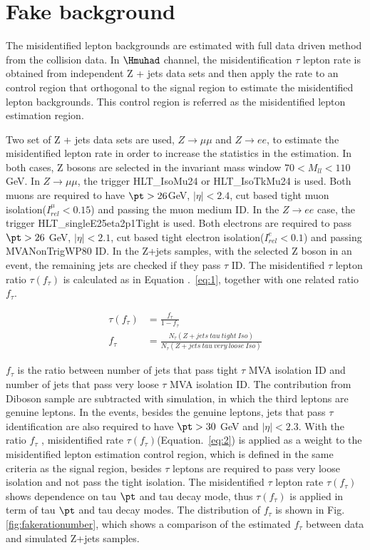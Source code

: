 


\chapter{Fake background}

The misidentified lepton backgrounds are estimated with full data driven method from the collision data. In $\Hmuhad$ channel,  the misidentification $\tau$ lepton rate is obtained from independent Z + jets data sets and then apply the rate to an control region that orthogonal to the signal region to estimate the misidentified lepton backgrounds. This control region is referred as the misidentified lepton estimation region. 

Two set of Z + jets data sets are used, $Z\rightarrow\mu\mu$ and $Z\rightarrow e e$, to estimate the misidentified lepton rate in order to increase the statistics in the estimation.  In both cases, Z bosons are selected in the invariant mass window $70<M_{ll}<110$ GeV. In $Z\rightarrow\mu\mu$, the trigger HLT\_IsoMu24 or HLT\_IsoTkMu24 is used. Both muons are required to have $\pt>26$GeV, $|\eta|<2.4$, cut based tight muon isolation($I^{\mu}_{rel}<0.15$) and passing the muon medium ID. In the $Z\rightarrow e e$ case, the trigger HLT\_singleE25eta2p1Tight is used. Both electrons are required to pass $\pt>26$ GeV, $|\eta|<2.1$, cut based tight electron isolation($I^{e}_{rel}<0.1$) and passing MVANonTrigWP80 ID. In the Z+jets samples, with the selected Z boson in an event, the remaining jets are checked if they pass $\tau$ ID. The misidentified $\tau$ lepton ratio $\tau(f_{\tau})$ is calculated as in Equation .~\ref{eq:1}, together with one related ratio $f_{\tau}$.

\begin{align} 
\tau(f_{\tau})&=\frac{f_{\tau}}{1-f_{\tau}} \label{eq:1}\\
f_{\tau}&=\frac{N_{\tau}(Z+jets\ tau\ tight\ Iso)}{N_{\tau}(Z+jets\ tau\ very\ loose\ Iso)} \label{eq:2}
\end{align}

$f_{\tau}$ is the ratio between number of jets that pass tight $\tau$ MVA isolation ID and number of jets that pass very loose $\tau$ MVA isolation ID. The contribution from Diboson sample are subtracted with simulation, in which the third leptons are genuine leptons. In the events, besides the genuine leptons, jets that pass $\tau$ identification are also required to have $\pt>30$ GeV and $|\eta|<2.3$. With the ratio $f_{\tau}$ , misidentified rate $\tau(f_{\tau})$(Equation.~\ref{eq:2}) is applied as a weight to the misidentified lepton estimation control region, which is defined in the same criteria as the signal region, besides $\tau$ leptons are required to pass very loose isolation and not pass the tight isolation. The misidentified $\tau$ lepton rate $\tau(f_{\tau})$ shows dependence on tau $\pt$ and tau decay mode, thus $\tau(f_{\tau})$ is applied in term of tau $\pt$ and tau decay modes. The distribution of $f_{\tau}$ is shown in Fig.~ \ref{fig:fakerationumber}, which shows a comparison of the estimated $f_{\tau}$ between data and simulated Z+jets samples. 

